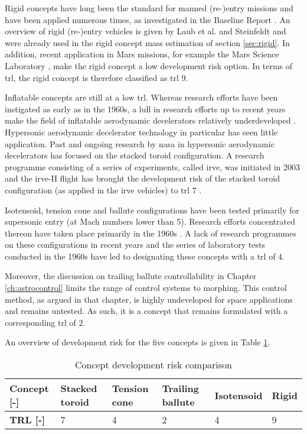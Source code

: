 Rigid concepts have long been the standard for manned (re-)entry missions and have been applied numerous times, as investigated in the Baseline Report \cite[p.2-3]{Balasooriyan2015a}. An overview of rigid (re-)entry vehicles is given by Laub et al. \cite{Laub2004} and Steinfeldt \cite{Steinfeldt2009} and were already used in the rigid concept mass estimation of section \ref{sec:rigid}. In addition, recent application in Mars missions, for example the Mars Science Laboratory \cite{Schoenenberger2009}, make the rigid concept a low development risk option. In terms of \gls{trl}, the rigid concept is therefore classified as \gls{trl} 9.

Inflatable concepts are still at a low \acrlong{trl}. Whereas research efforts have been instigated as early as in the 1960s, a lull in research efforts up to recent years make the field of inflatable aerodynamic decelerators relatively underdeveloped \cite{Smith2010}. Hypersonic aerodynamic decelerator technology in particular has seen little application. Past and ongoing research by \gls{nasa} in hypersonic aerodynamic decelerators has focused on the stacked toroid configuration. A research programme consisting of a series of experiments, called \acrfull{irve}, was initiated in 2003 and the \gls{irve}-II flight has brought the development risk of the stacked toroid configuration (as applied in the \gls{irve} vehicles) to \gls{trl} 7 \cite{Player2005}.

Isotensoid, tension cone and ballute configurations have been tested primarily for supersonic entry (at Mach numbers lower than 5). Research efforts concentrated thereon have taken place primarily in the 1960s \cite{Smith2010}. A lack of research programmes on these configurations in recent years and the series of laboratory tests conducted in the 1960s have led to designating these concepts with a \gls{trl} of 4.

Moreover, the discussion on trailing ballute controllability in Chapter \ref{ch:astrocontrol} limits the range of control systems to morphing. This control method, as argued in that chapter, is highly undeveloped for space applications and remains untested. As such, it is a concept that remains formulated with a corresponding \gls{trl} of 2.

An overview of development risk for the five concepts is given in Table \ref{tab:concrisk}.

\begin{table}[h]
\centering
\caption{Concept development risk comparison}
\begin{tabular}{|l|l|l|l|l|l|}
\hline
\textbf{Concept {[}-{]}} & Stacked toroid & Tension cone & Trailing ballute & Isotensoid & Rigid \\ \hline
\textbf{TRL {[}-{]}}     & 7              & 4            & 2                & 4          & 9     \\ \hline
\end{tabular}
\label{tab:concrisk}
\end{table}

